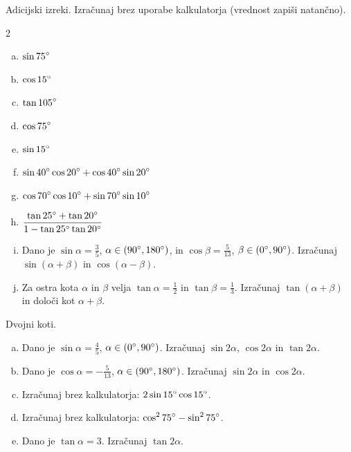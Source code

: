 \documentclass[a4paper,12pt]{letter}
\newcounter{tocke}
\begin{document}
\begin{naloga}[\hfill $\tockeA$] \addtocounter{tocke}{\numexpr\tockeA\relax}
Adicijski izreki. Izra\v{c}unaj brez uporabe kalkulatorja (vrednost zapi\v{s}i natan\v{c}no).
\begin{multicols}{2}
\begin{enumerate}[a)]
\item $\displaystyle \sin75\degree$
\item $\displaystyle \cos15\degree$
\item $\displaystyle \tan105\degree$
\item $\displaystyle \cos75\degree$
\end{enumerate}
\columnbreak
\begin{enumerate}[a)]\setcounter{enumi}{4}
\item $\displaystyle \sin15\degree$
\item $\displaystyle \sin40\degree\cos20\degree+\cos40\degree\sin20\degree$
\item $\displaystyle \cos70\degree\cos10\degree+\sin70\degree\sin10\degree$
\item $\displaystyle \frac{\tan25\degree+\tan20\degree}{1-\tan25\degree\tan20\degree}$
\end{enumerate}
\end{multicols}
\begin{enumerate}[a)]\setcounter{enumi}{8}
\item Dano je $\sin\alpha=\frac35$, $\alpha\in(90\degree,180\degree)$, in $\cos\beta=\frac{5}{13}$, $\beta\in(0\degree,90\degree)$. Izra\v{c}unaj $\sin(\alpha+\beta)$ in $\cos(\alpha-\beta)$.
\item Za ostra kota $\alpha$ in $\beta$ velja $\tan\alpha=\frac12$ in $\tan\beta=\frac13$. Izra\v{c}unaj $\tan(\alpha+\beta)$ in dolo\v{c}i kot $\alpha+\beta$.
\end{enumerate}
\end{naloga}

\begin{naloga}[\hfill $\tockeB$] \addtocounter{tocke}{\numexpr\tockeB\relax}
Dvojni koti.
\begin{enumerate}[a)]
\item Dano je $\sin\alpha=\frac45$, $\alpha\in(0\degree,90\degree)$. Izra\v{c}unaj $\sin2\alpha$, $\cos2\alpha$ in $\tan2\alpha$.
\item Dano je $\cos\alpha=-\frac{5}{13}$, $\alpha\in(90\degree,180\degree)$. Izra\v{c}unaj $\sin2\alpha$ in $\cos2\alpha$.
\item Izra\v{c}unaj brez kalkulatorja: $\displaystyle 2\sin15\degree\cos15\degree$.
\item Izra\v{c}unaj brez kalkulatorja: $\displaystyle \cos^275\degree-\sin^275\degree$.
\item Dano je $\tan\alpha=3$. Izra\v{c}unaj $\tan2\alpha$.
\end{enumerate}
\end{naloga}
\end{document}
